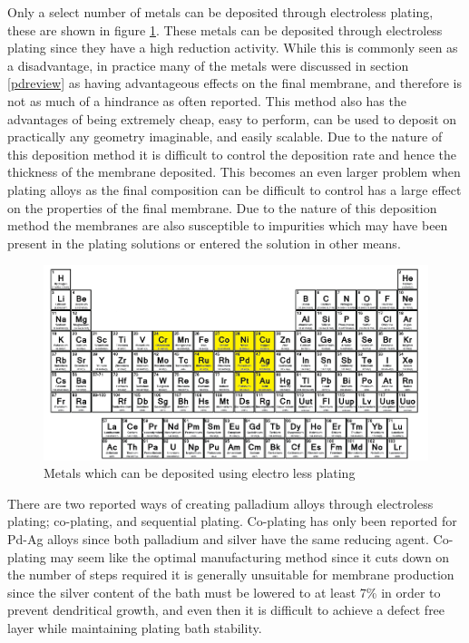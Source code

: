 Only a select number of metals can be deposited through electroless plating, these are shown in figure \ref{fig:elpmetals}. \cite{Exter2015} These metals can be deposited through electroless plating since they have a high reduction activity. While this is commonly seen as a disadvantage, in practice many of the metals were discussed in section \ref{pdreview} as having advantageous effects on the final membrane, and therefore is not as much of a hindrance as often reported. \cite{Exter2015} This method also has the advantages of being extremely cheap, easy to perform, can be used to deposit on practically any geometry imaginable, and easily scalable. Due to the nature of this deposition method it is difficult to control the deposition rate and hence the thickness of the membrane deposited. This becomes an even larger problem when plating alloys as the final composition can be difficult to control has a large effect on the properties of the final membrane. Due to the nature of this deposition method the membranes are also susceptible to impurities which may have been present in the plating solutions or entered the solution in other means. 

\begin{figure}[H]
    \centering
    \includegraphics{figures/elpmetals.png}
    \caption{Metals which can be deposited using electro less plating  \cite{Exter2015}}
    \label{fig:elpmetals}
\end{figure}

There are two reported ways of creating palladium alloys through electroless plating; co-plating, and sequential plating. Co-plating has only been reported for Pd-Ag alloys since both palladium and silver have the same reducing agent.\cite{Kikuchi1991, UEMIYA1991303} Co-plating may seem like the optimal manufacturing method since it cuts down on the number of steps required it is generally unsuitable for membrane production since the silver content of the bath must be lowered to at least 7\% in order to prevent dendritical growth, and even then it is difficult to achieve a defect free layer while maintaining plating bath stability. \cite{Exter2015}


